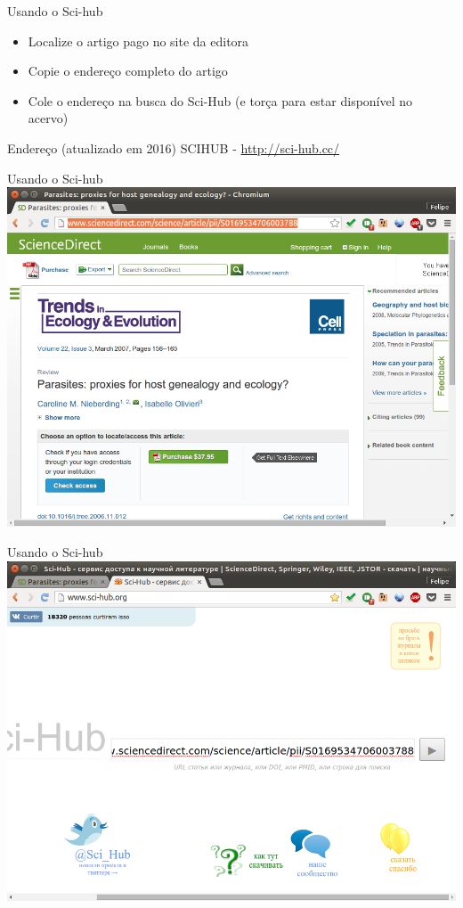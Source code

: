 \documentclass{beamer}
\begin{document}
\begin{frame}{Usando o Sci-hub}
  \begin{itemize}
  \item Localize o artigo pago no site da editora
  \item Copie o endereço completo do artigo
  \item Cole o endereço na busca do Sci-Hub (e torça para estar
    disponível no acervo)
  \end{itemize}
  \begin{block}{Endereço (atualizado em 2016)}
    SCIHUB - \url{http://sci-hub.cc/}
  \end{block}

\end{frame}

\begin{frame}{Usando o Sci-hub}
  \includegraphics[height=.85\textheight]{Busca/scihub-busca1}
\end{frame}

\begin{frame}{Usando o Sci-hub}
  \includegraphics[height=.85\textheight]{Busca/scihub-busca2}
\end{frame}
\end{document}

